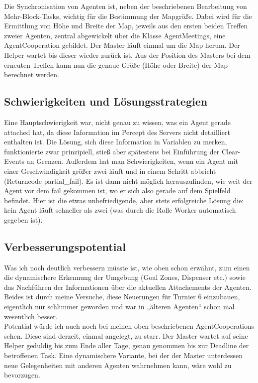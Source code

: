 \documentclass[runningheads]{llncs}
\begin{document}
	Die Synchronisation von Agenten ist, neben der beschriebenen Bearbeitung von Mehr-Block-Tasks, wichtig für die Bestimmung der Mapgröße. Dabei wird für die Ermittlung von Höhe und Breite der Map, jeweils aus den ersten beiden Treffen zweier Agenten, zentral abgewickelt über die Klasse AgentMeetings, eine AgentCooperation gebildet. Der Master läuft einmal um die Map herum. Der Helper wartet bis dieser wieder zurück ist. Aus der Position des Masters bei dem erneuten Treffen kann nun die genaue Größe (Höhe oder Breite) der Map berechnet werden. 
	
	\subsection{Schwierigkeiten und Lösungsstrategien}
	Eine Hauptschwierigkeit war, nicht genau zu wissen, was ein Agent gerade attached hat, da diese Information im Percept des Servers nicht detailliert enthalten ist. Die Lösung, sich diese Information in Variablen zu merken, funktionierte zwar prinzipiell, stieß aber spätestens bei Einführung der Clear-Events an Grenzen. Außerdem hat man Schwierigkeiten, wenn ein Agent mit einer Geschwindigkeit größer zwei läuft und in einem Schritt abbricht (Returncode partial\_fail). Es ist dann nicht möglich herauszufinden, wie weit der Agent vor dem fail gekommen ist, wo er sich also gerade auf dem Spielfeld befindet. Hier ist die etwas unbefriedigende, aber stets erfolgreiche Lösung die: kein Agent läuft schneller als zwei (was durch die Rolle Worker automatisch gegeben ist). 
	
	\subsection{Verbesserungspotential}
	Was ich noch deutlich verbessern müsste ist, wie oben schon erwähnt, zum einen die dynamischere Erkennung der Umgebung (Goal Zones, Dispenser etc.) sowie das Nachführen der Informationen über die aktuellen Attachements der Agenten. Beides ist durch meine Versuche, diese Neuerungen für Turnier 6 einzubauen, eigentlich nur schlimmer geworden und war in „älteren Agenten“ schon mal wesentlich besser.\\
	
	Potential würde ich auch noch bei meinen oben beschriebenen AgentCooperations sehen. Diese sind derzeit, einmal angelegt, zu starr. Der Master wartet auf seine Helper geduldig bis zum Ende aller Tage, genau genommen bis zur Deadline der betroffenen Task. Eine dynamischere Variante, bei der der Master unterdessen neue Gelegenheiten mit anderen Agenten wahrnehmen kann, wäre wohl zu bevorzugen.  
	
\end{document}
